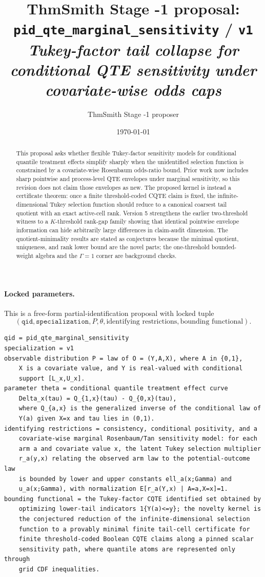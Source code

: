 \documentclass[11pt]{article}
\title{ThmSmith Stage -1 proposal: \texttt{pid\_qte\_marginal\_sensitivity} / \texttt{v1}%
  \\ \large\textit{Tukey-factor tail collapse for conditional QTE sensitivity under covariate-wise odds caps}}
\author{ThmSmith Stage -1 proposer}
\date{\today}
\theoremstyle{definition}
\theoremstyle{plain}
\theoremstyle{remark}
\begin{document}
\maketitle


\paragraph{Locked parameters.}
This is a free-form partial-identification proposal with locked tuple
\[
(\texttt{qid},\texttt{specialization},P,\theta,\text{identifying restrictions},\text{bounding functional}).
\]
\begin{verbatim}
qid = pid_qte_marginal_sensitivity
specialization = v1
observable distribution P = law of O = (Y,A,X), where A in {0,1},
    X is a covariate value, and Y is real-valued with conditional
    support [L_x,U_x].
parameter theta = conditional quantile treatment effect curve
    Delta_x(tau) = Q_{1,x}(tau) - Q_{0,x}(tau),
    where Q_{a,x} is the generalized inverse of the conditional law of
    Y(a) given X=x and tau lies in (0,1).
identifying restrictions = consistency, conditional positivity, and a
    covariate-wise marginal Rosenbaum/Tan sensitivity model: for each
    arm a and covariate value x, the latent Tukey selection multiplier
    r_a(y,x) relating the observed arm law to the potential-outcome law
    is bounded by lower and upper constants ell_a(x;Gamma) and
    u_a(x;Gamma), with normalization E[r_a(Y,x) | A=a,X=x]=1.
bounding functional = the Tukey-factor CQTE identified set obtained by
    optimizing lower-tail indicators 1{Y(a)<=y}; the novelty kernel is
    the conjectured reduction of the infinite-dimensional selection
    function to a provably minimal finite tail-cell certificate for
    finite threshold-coded Boolean CQTE claims along a pinned scalar
    sensitivity path, where quantile atoms are represented only through
    grid CDF inequalities.
\end{verbatim}

\begin{abstract}
This proposal asks whether flexible Tukey-factor sensitivity models for conditional quantile treatment effects simplify sharply when the unidentified selection function is constrained by a covariate-wise Rosenbaum odds-ratio bound.  Prior work now includes sharp pointwise and process-level QTE envelopes under marginal sensitivity, so this revision does not claim those envelopes as new.  The proposed kernel is instead a certificate theorem: once a finite threshold-coded CQTE claim is fixed, the infinite-dimensional Tukey selection function should reduce to a canonical coarsest tail quotient with an exact active-cell rank.  Version 5 strengthens the earlier two-threshold witness to a \(K\)-threshold rank-gap family showing that identical pointwise envelope information can hide arbitrarily large differences in claim-audit dimension.  The quotient-minimality results are stated as conjectures because the minimal quotient, uniqueness, and rank lower bound are the novel parts; the one-threshold bounded-weight algebra and the \(\Gamma=1\) corner are background checks.
\end{abstract}
\end{document}
